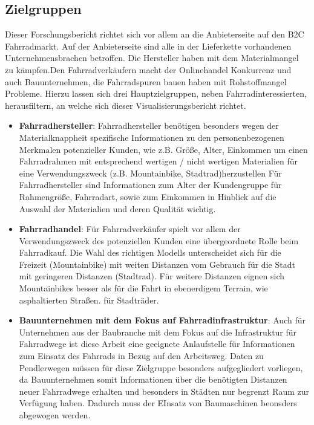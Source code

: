 \documentclass[usegeometry=true]{scrartcl}
\begin{document}
\subsection{Zielgruppen}
Dieser Forschungsbericht richtet sich vor allem an die Anbieterseite auf den B2C Fahrradmarkt. Auf der Anbieterseite sind alle in der Lieferkette vorhandenen Unternehmensbrachen betroffen. Die Hersteller haben mit dem Materialmangel zu kämpfen.Den Fahrradverkäufern macht der Onlinehandel Konkurrenz und auch Bauunternehmen, die Fahrradspuren bauen haben mit Rohstoffmangel Probleme.  Hierzu lassen sich drei Hauptzielgruppen, neben Fahrradinteressierten, herausfiltern, an welche sich dieser Visualisierungsbericht richtet.
\begin{itemize}
 \item \textbf{Fahrradhersteller}: 
 \newline Fahrradhersteller benötigen besonders wegen der Materialknappheit spezifische Informationen zu den personenbezogenen Merkmalen potenzieller Kunden, wie z.B. Größe, Alter, Einkommen um einen Fahrradrahmen mit entsprechend wertigen / nicht wertigen Materialien für eine Verwendungszweck (z.B. Mountainbike, Stadtrad)herzustellen 
 Für Fahrradhersteller sind Informationen zum Alter der Kundengruppe für Rahmengröße, Fahrradart, sowie zum Einkommen in Hinblick auf die Auswahl der Materialien und deren Qualität wichtig. 
 \item \textbf{Fahrradhandel}:
 \newline Für Fahrradverkäufer spielt vor allem der Verwendungszweck des potenziellen Kunden eine übergeordnete Rolle beim Fahrradkauf. Die Wahl des richtigen Modells unterscheidet sich für die Freizeit (Mountainbike) mit weiten Distanzen vom Gebrauch für die Stadt mit geringeren Distanzen (Stadtrad). Für weitere Distanzen eignen sich Mountainbikes besser als für die Fahrt in ebenerdigem Terrain, wie asphaltierten Straßen. für Stadträder. 

 \item \textbf{Bauunternehmen mit dem Fokus auf Fahrradinfrastruktur}:
 \newline Auch für Unternehmen aus der Baubranche mit dem Fokus auf die Infrastruktur für Fahrradwege ist diese Arbeit eine geeignete Anlaufstelle für Informationen zum Einsatz des Fahrrads in Bezug auf den Arbeitsweg. Daten zu Pendlerwegen müssen für diese Zielgruppe besonders aufgegliedert vorliegen, da Bauunternehmen somit Informationen über die benötigten Distanzen neuer Fahrradwege erhalten und besonders in Städten nur begrenzt Raum zur Verfügung haben. Dadurch muss der EInsatz von Baumaschinen beonsders abgewogen werden. 
 
\end{itemize}
\end{document}
